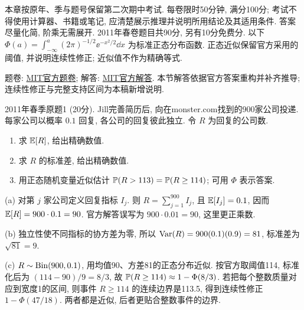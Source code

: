 本章按原年、季与题号保留第二次期中考试. 每卷限时50分钟, 满分100分; 考试不得使用计算器、书籍或笔记, 应清楚展示推理并说明所用结论及其适用条件. 答案尽量化简, 阶乘无需展开. 2011年春卷题目共90分, 另有10分免费分. 以下 $\Phi(a)=\int_{-\infty}^a(2\pi)^{-1/2}\ee^{-x^2/2}\dd x$ 为标准正态分布函数. 正态近似保留官方采用的阈值, 并说明连续性修正; 近似值不作为精确等式.

题卷: \href{https://ocw.mit.edu/courses/18-600-probability-and-random-variables-fall-2019/resources/mit18_600f19_mid2_s2011/}{MIT官方题卷}; 解答: \href{https://ocw.mit.edu/courses/18-600-probability-and-random-variables-fall-2019/resources/mit18_600f19_mid2_s2011_soln/}{MIT官方解答}. 本节解答依据官方答案重构并补齐推导; 连续性修正与完整支持区间为本稿新增说明.

\begin{exercise}\label{m2:2011s:q1}
2011年春季原题1 (20分). Jill完善简历后, 向在monster.com找到的900家公司投递. 每家公司以概率 $0.1$ 回复, 各公司的回复彼此独立. 令 $R$ 为回复的公司数.
\begin{enumerate}
\item[(a)]\label{m2:2011s:q1:a} 求 $\mathbb E[R]$, 给出精确数值.
\item[(b)]\label{m2:2011s:q1:b} 求 $R$ 的标准差, 给出精确数值.
\item[(c)]\label{m2:2011s:q1:c} 用正态随机变量近似估计 $\mathbb P(R>113)=\mathbb P(R\ge114)$; 可用 $\Phi$ 表示答案.
\end{enumerate}
\end{exercise}
\begin{solution}
(a) 对第 $j$ 家公司定义回复指标 $I_j$. 则 $R=\sum_{j=1}^{900}I_j$, 且 $\mathbb E[I_j]=0.1$, 因而 $\mathbb E[R]=900\cdot0.1=90$. 官方解答误写为 $900\cdot0.01=90$, 这里更正乘数.

(b) 独立性使不同指标的协方差为零, 所以 $\operatorname{Var}(R)=900(0.1)(0.9)=81$, 标准差为 $\sqrt{81}=9$.

(c) $R\sim\operatorname{Bin}(900,0.1)$, 用均值90、方差81的正态分布近似. 按官方取阈值114, 标准化后为 $(114-90)/9=8/3$, 故 $\mathbb P(R\ge114)\approx1-\Phi(8/3)$. 若把每个整数质量对应到宽度1的区间, 则事件 $R\ge114$ 的连续边界是113.5, 得到连续性修正 $1-\Phi(47/18)$. 两者都是近似, 后者更贴合整数事件的边界.
\end{solution}

